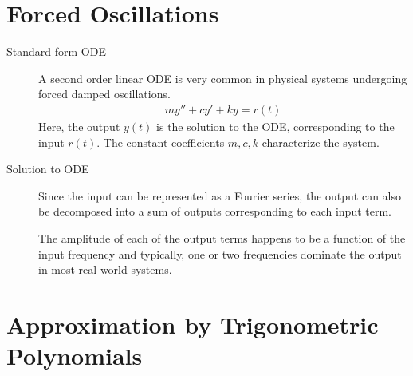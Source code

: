 \section{Forced Oscillations}

\begin{description}
    \item[Standard form ODE] A second order linear ODE is very common in physical systems
        undergoing forced damped oscillations.
        \begin{align}
            my'' + cy' + ky = r(t)
        \end{align}
        Here, the output $ y(t) $ is the solution to the ODE, corresponding to the input
        $ r(t) $. The constant coefficients $ m, c, k $ characterize the system.

    \item[Solution to ODE] Since the input can be represented as a Fourier series,
        the output can also be decomposed into a sum of outputs corresponding to each
        input term. \par
        The amplitude of each of the output terms happens to be a function of the input
        frequency and typically, one or two frequencies dominate the output in most real
        world systems.
\end{description}

\section{Approximation by Trigonometric Polynomials}

